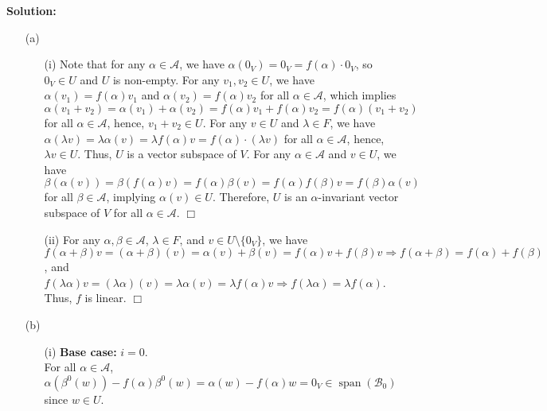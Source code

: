 \documentclass[12pt]{article}
\DeclareMathOperator{\spn}{span}
\begin{document}
\noindent \textbf{Solution:} 
\begin{enumerate}
    \item[(a)] \begin{enumerate}
        \item[(i)] Note that for any $\alpha \in \mathcal{A}$, we have $\alpha(0_V) = 0_V = f(\alpha) \cdot 0_V$, so $0_V \in U$ and $U$ is non-empty. For any $v_1, v_2 \in U$, we have $\alpha(v_1) = f(\alpha)v_1$ and $\alpha(v_2) = f(\alpha)v_2$ for all $\alpha \in \mathcal{A}$, which implies $\alpha(v_1 + v_2) = \alpha(v_1) + \alpha(v_2) = f(\alpha)v_1 + f(\alpha)v_2 = f(\alpha)(v_1 + v_2)$ for all $\alpha \in \mathcal{A}$, hence, $v_1 + v_2 \in U$. For any $v \in U$ and $\lambda \in F$, we have $\alpha(\lambda v) = \lambda \alpha(v) = \lambda f(\alpha)v = f(\alpha) \cdot (\lambda v)$ for all $\alpha \in \mathcal{A}$, hence, $\lambda v \in U$. Thus, $U$ is a vector subspace of $V$. For any $\alpha \in \mathcal{A}$ and $v \in U$, we have $\beta(\alpha(v)) = \beta(f(\alpha)v) = f(\alpha)\beta(v) = f(\alpha)f(\beta)v = f(\beta)\alpha(v)$ for all $\beta \in \mathcal{A}$, implying $\alpha(v) \in U$. Therefore, $U$ is an $\alpha$-invariant vector subspace of $V$ for all $\alpha \in \mathcal{A}$. \hfill $\Box$
        \item[(ii)] For any $\alpha, \beta \in \mathcal{A}$, $\lambda \in F$, and $v \in U \setminus \{0_V\}$, we have $f(\alpha + \beta)v = (\alpha + \beta)(v) = \alpha(v) + \beta(v) = f(\alpha)v + f(\beta)v \Rightarrow f(\alpha + \beta) = f(\alpha) + f(\beta)$, and $f(\lambda\alpha)v = (\lambda\alpha)(v) = \lambda \alpha(v) = \lambda f(\alpha)v \Rightarrow f(\lambda \alpha) = \lambda f(\alpha)$. Thus, $f$ is linear. \hfill $\Box$
    \end{enumerate}
    \item[(b)] \begin{enumerate}
        \item[(i)] \textbf{Base case:} $i = 0$. \\
    For all $\alpha \in \mathcal{A}$, $\alpha(\beta^0(w)) - f(\alpha)\beta^0(w) = \alpha(w) - f(\alpha)w = 0_V \in \spn(\mathcal{B}_0)$ since $w \in U$.


\end{enumerate}
\end{enumerate}
\end{document}
